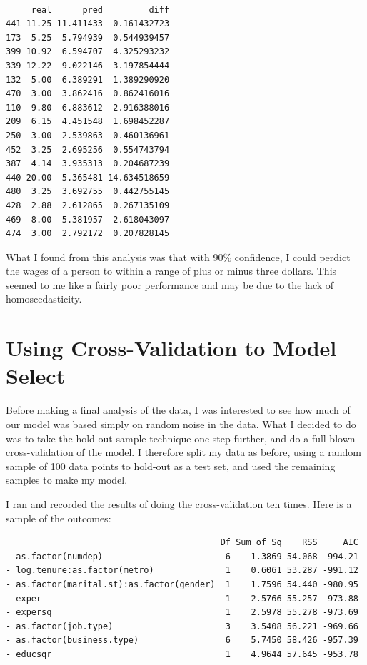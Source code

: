 \documentclass[12pt,a4paper,twoside]{article}
\begin{document}
\begin{verbatim}

     real      pred         diff
441 11.25 11.411433  0.161432723
173  5.25  5.794939  0.544939457
399 10.92  6.594707  4.325293232
339 12.22  9.022146  3.197854444
132  5.00  6.389291  1.389290920
470  3.00  3.862416  0.862416016
110  9.80  6.883612  2.916388016
209  6.15  4.451548  1.698452287
250  3.00  2.539863  0.460136961
452  3.25  2.695256  0.554743794
387  4.14  3.935313  0.204687239
440 20.00  5.365481 14.634518659
480  3.25  3.692755  0.442755145
428  2.88  2.612865  0.267135109
469  8.00  5.381957  2.618043097
474  3.00  2.792172  0.207828145
\end{verbatim}

What I found from this analysis was that with 90\% confidence, I could perdict the wages of a person to within a range of plus or minus three dollars. This seemed to me like a fairly poor performance and may be due to the lack of homoscedasticity. 

\section{Using Cross-Validation to Model Select} 
Before making a final analysis of the data, I was interested to see how much of our model was based simply on random noise in the data. What I decided to do was to take the hold-out sample technique one step further, and do a full-blown cross-validation of the model. I therefore split my data as before, using a random sample of 100 data points to hold-out as a test set, and used the remaining samples to make my model.

I ran and recorded the results of doing the cross-validation ten times. Here is a sample of the outcomes:

\begin{verbatim}
                                          Df Sum of Sq    RSS     AIC
- as.factor(numdep)                        6    1.3869 54.068 -994.21
- log.tenure:as.factor(metro)              1    0.6061 53.287 -991.12
- as.factor(marital.st):as.factor(gender)  1    1.7596 54.440 -980.95
- exper                                    1    2.5766 55.257 -973.88
- expersq                                  1    2.5978 55.278 -973.69
- as.factor(job.type)                      3    3.5408 56.221 -969.66
- as.factor(business.type)                 6    5.7450 58.426 -957.39
- educsqr                                  1    4.9644 57.645 -953.78
\end{verbatim}
\end{document}
